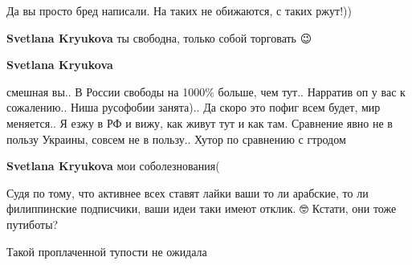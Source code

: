 \begin{itemize}
\begin{itemize}
Да вы просто бред написали. На таких не обижаются, с таких ржут!))

 
\textbf{Svetlana Kryukova} ты свободна, только собой торговать 😉

 
\textbf{Svetlana Kryukova} 

смешная вы.. В России свободы на 1000\% больше, чем тут.. Нарратив оп у вас к
сожалению.. Ниша русофобии занята).. Да скоро это пофиг всем будет, мир
меняется.. Я езжу в РФ и вижу, как живут тут и как там. Сравнение явно не в
пользу Украины, совсем не в пользу.. Хутор по сравнению с гтродом


 
\textbf{Svetlana Kryukova} мои соболезнования(

 
Судя по тому, что активнее всех ставят лайки ваши то ли арабские, то ли филиппинские подписчики, ваши идеи таки имеют отклик. 🤓 Кстати, они тоже путиботы?

 
Такой проплаченной тупости не ожидала

 

\end{itemize}
\end{itemize}
